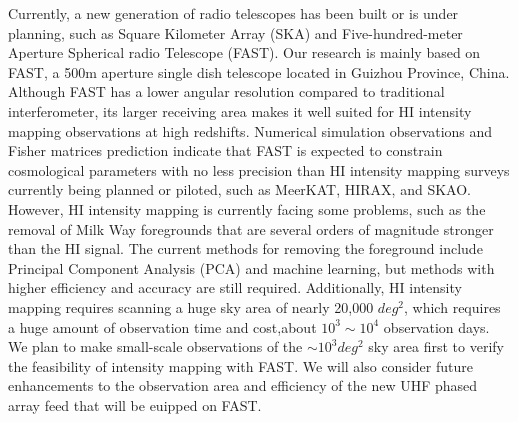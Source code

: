 \documentclass{article}
\begin{document}
Currently, a new generation of radio telescopes has been built or is under planning, such as Square Kilometer Array (SKA)\cite{Dewdney_2009} and Five-hundred-meter Aperture Spherical radio Telescope (FAST)\cite{Nan_2011}. Our research is mainly based on FAST, a 500m aperture single dish telescope located in Guizhou Province, China. Although FAST has a lower angular resolution compared to traditional interferometer, its larger receiving area makes it well suited for HI intensity mapping observations at high redshifts. Numerical simulation observations and Fisher matrices prediction\cite{Hu_2020}\cite{Karagiannis_2022} indicate that FAST is expected to constrain cosmological parameters with no less precision than HI intensity mapping surveys currently being planned or piloted, such as MeerKAT\cite{Wang_2021}, HIRAX\cite{Crichton_2022}, and SKAO\cite{SKAO_2020}. However, HI intensity mapping is currently facing some problems, such as the removal of Milk Way foregrounds that are several orders of magnitude stronger than the HI signal. The current methods for removing the foreground include Principal Component Analysis (PCA)\cite{Hu_2021} and machine learning\cite{Ni_2022}, but methods with higher efficiency and accuracy are still required. Additionally, HI intensity mapping requires scanning a huge sky area of nearly 20,000 $deg^2$\cite{Hu_2020}\cite{Zhang_2019}, which requires a huge amount of observation time and cost,about $10^3\sim 10^4$ observation days. We plan to make small-scale observations of the $\sim 10^3 deg^2$ sky area first to verify the feasibility of intensity mapping with FAST. We will also consider future enhancements to the observation area and efficiency of the new UHF phased array feed that will be euipped on FAST. 
\end{document}
